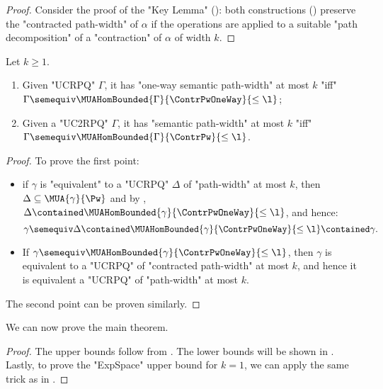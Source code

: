 \begin{proof}
	Consider the proof of the "Key Lemma" ():
	both constructions () preserve the "contracted path-width" of $\alpha$ if the operations are applied
	to a suitable "path decomposition" of a "contraction" of $\alpha$ of width $k$.
\end{proof}

\begin{lemma}
	\AP\label{lemma:characterisation-bounded-semantic-pw}
	Let $k \geq 1$.
	\begin{enumerate}
		\item Given "UCRPQ" $\Gamma$, it has "one-way semantic path-width" at most $k$
			"iff" $\Gamma \semequiv \MUAHomBounded{\Gamma}{\ContrPwOneWay}{\leq\l}$;
		\item Given a "UC2RPQ" $\Gamma$, it has "semantic path-width" at most $k$
			"iff" $\Gamma \semequiv \MUAHomBounded{\Gamma}{\ContrPw}{\leq\l}$.
	\end{enumerate}
\end{lemma}

\begin{proof}
	To prove the first point:
	\begin{itemize}
		\item if $\gamma$ is "equivalent" to a "UCRPQ" $\Delta$ of "path-width" at most $k$, then
			$\Delta \subseteq \MUA{\gamma}{\Pw}$ and by ,
			$\Delta \contained \MUAHomBounded{\gamma}{\ContrPwOneWay}{\leq\l}$,
			and hence:
			\[
				\gamma \semequiv \Delta
				\contained \MUAHomBounded{\gamma}{\ContrPwOneWay}{\leq\l}
				\contained \gamma.
			\]
		\item If $\gamma \semequiv \MUAHomBounded{\gamma}{\ContrPwOneWay}{\leq\l}$, 
			then $\gamma$ is equivalent to a "UCRPQ" of "contracted path-width" at
			most $k$, and hence it is equivalent a "UCRPQ" of "path-width" at most $k$. 
	\end{itemize}
	The second point can be proven similarly.
\end{proof}

We can now prove the main theorem.
\decidabilitySemPw

\begin{proof}
	The upper bounds follow from .
	The lower bounds will be shown in . Lastly, to prove the "ExpSpace" upper bound
	for $k=1$, we can apply the same trick as in .
\end{proof}

